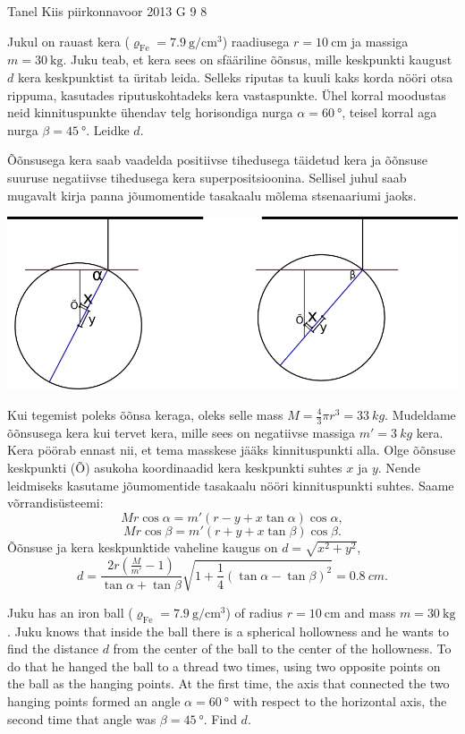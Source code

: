 {Tanel Kiis} %
{piirkonnavoor} %
{2013} %
{G 9} %
{8} %
{
\ifStatement
Jukul on rauast kera
($\varrho_\mathrm{Fe}=\SI{7,9}{\gram\per\centi\meter\cubed}$) raadiusega
$r=\SI{10}{\centi\meter}$ ja massiga $m=\SI{30}{\kilo\gram}$. Juku teab, et kera
sees on sfääriline õõnsus, mille keskpunkti kaugust $d$ kera keskpunktist ta üritab
leida. Selleks riputas ta kuuli kaks korda nööri otsa rippuma, kasutades
riputuskohtadeks kera vastaspunkte. Ühel korral moodustas neid kinnituspunkte
ühendav telg horisondiga nurga $\alpha=\SI{60}{\degree}$, teisel korral aga nurga
$\beta=\SI{45}{\degree}$. Leidke $d$.
\fi


\ifHint
Õõnsusega kera saab vaadelda positiivse tihedusega täidetud kera ja õõnsuse suuruse negatiivse tihedusega kera superpositsioonina. Sellisel juhul saab mugavalt kirja panna jõumomentide tasakaalu mõlema stsenaariumi jaoks.
\fi


\ifSolution
\begin{center}
\includegraphics[width=\textwidth]{2013-v2g-09-kera.png}
\end{center}

Kui tegemist poleks õõnsa keraga, oleks selle mass $M=\frac{4}{3}\pi r^3 = \SI{33}{kg}$. Mudeldame õõnsusega kera kui tervet kera, mille sees on negatiivse massiga $m'=\SI{3}{kg}$ kera. Kera pöörab ennast nii, et tema masskese jääks kinnituspunkti alla. Olge õõnsuse keskpunkti (Õ) asukoha koordinaadid kera keskpunkti suhtes $x$ ja $y$. Nende leidmiseks kasutame jõumomentide tasakaalu nööri kinnituspunkti suhtes. Saame võrrandisüsteemi:
\[Mr \cos \alpha = m'(r-y+x \tan \alpha) \cos \alpha,\]
\[Mr \cos \beta = m'(r+y+x \tan \beta) \cos \beta.\]
Õõnsuse ja kera keskpunktide vaheline kaugus on $d=\sqrt{x^2+y^2}$,
\[ d=\frac{2r(\frac{M}{m'}-1)}{\tan\alpha+\tan\beta}\sqrt{1+\frac{1}{4}(\tan\alpha-\tan\beta)^2} = \SI{0,8}{cm}. \]
\fi


\ifEngStatement
Juku has an iron ball ($\varrho_\mathrm{Fe}=\SI{7,9}{\gram\per\centi\meter\cubed}$) of radius $r=\SI{10}{\centi\meter}$ and mass $m=\SI{30}{\kilo\gram}$. Juku knows that inside the ball there is a spherical hollowness and he wants to find the distance $d$ from the center of the ball to the center of the hollowness. To do that he hanged the ball to a thread two times, using two opposite points on the ball as the hanging points. At the first time, the axis that connected the two hanging points formed an angle $\alpha=\SI{60}{\degree}$ with respect to the horizontal axis, the second time that angle was $\beta=\SI{45}{\degree}$. Find $d$.
\fi


}
